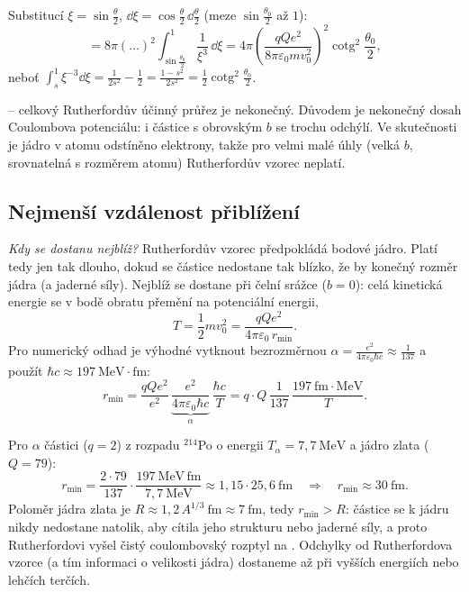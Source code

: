 Substitucí $\xi = \sin\frac{\theta}{2}$, $\dd\xi = \cos\frac{\theta}{2}\,\dd\frac{\theta}{2}$ (meze $\sin\frac{\theta_0}{2}$ až $1$):
\begin{equation}
  = 8\pi(\ldots)^2\int_{\sin\frac{\theta_0}{2}}^{1}\frac{1}{\xi^3}\,\dd\xi
  = 4\pi\left(\frac{qQe^2}{8\pi\varepsilon_0 m v_0^2}\right)^2\operatorname{cotg}^2\frac{\theta_0}{2},
\end{equation}
neboť $\int_s^1\xi^{-3}\dd\xi = \frac{1}{2s^2}-\frac12 = \frac{1-s^2}{2s^2} = \frac12\operatorname{cotg}^2\frac{\theta_0}{2}$.

 -- celkový Rutherfordův účinný průřez je nekonečný. Důvodem je nekonečný dosah Coulombova potenciálu: i částice s obrovským $b$ se trochu odchýlí. Ve skutečnosti je jádro v atomu odstíněno elektrony, takže pro velmi malé úhly (velká $b$, srovnatelná s rozměrem atomu) Rutherfordův vzorec neplatí.

\subsection{Nejmenší vzdálenost přiblížení}

\emph{Kdy se dostanu nejblíž?} Rutherfordův vzorec předpokládá bodové jádro. Platí tedy jen tak dlouho, dokud se částice nedostane tak blízko, že by  konečný rozměr jádra (a jaderné síly). Nejblíž se dostane při čelní srážce ($b=0$): celá kinetická energie se v bodě obratu přemění na potenciální energii,
\begin{equation}
  T = \frac12 m v_0^2 = \frac{qQe^2}{4\pi\varepsilon_0\,r_{\min}} .
\end{equation}
Pro numerický odhad je výhodné vytknout bezrozměrnou  $\alpha = \frac{e^2}{4\pi\varepsilon_0\hbar c}\approx\frac{1}{137}$ a použít $\hbar c \approx 197\ \mathrm{MeV\cdot fm}$:
\begin{equation}
  r_{\min} = \frac{qQe^2}{e^2}\,\underbrace{\frac{e^2}{4\pi\varepsilon_0\hbar c}}_{\alpha}\,\frac{\hbar c}{T}
  = q\cdot Q\,\frac{1}{137}\,\frac{197\ \mathrm{fm\cdot MeV}}{T} .
\end{equation}

\begin{priklad}
Pro $\alpha$ částici ($q=2$) z rozpadu $^{214}$Po o energii $T_\alpha = 7{,}7\ \mathrm{MeV}$ a jádro zlata ($Q=79$):
\[
  r_{\min} = \frac{2\cdot 79}{137}\cdot\frac{197\ \mathrm{MeV\,fm}}{7{,}7\ \mathrm{MeV}} \approx 1{,}15\cdot 25{,}6\ \mathrm{fm}
  \quad\Longrightarrow\quad r_{\min}\approx 30\ \mathrm{fm}.
\]
Poloměr jádra zlata je $R\approx 1{,}2\,A^{1/3}\ \mathrm{fm}\approx 7\ \mathrm{fm}$, tedy $r_{\min}>R$: částice se k jádru nikdy nedostane natolik, aby cítila jeho strukturu nebo jaderné síly, a proto Rutherfordovi vyšel čistý coulombovský rozptyl na . Odchylky od Rutherfordova vzorce (a tím informaci o velikosti jádra) dostaneme až při vyšších energiích nebo lehčích terčích.
\end{priklad}

